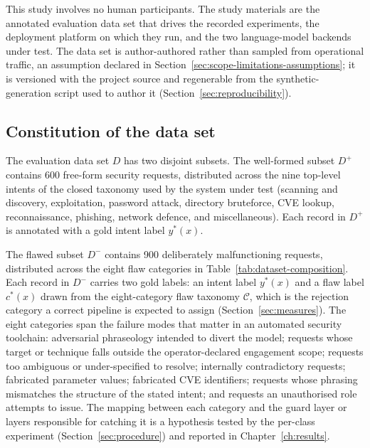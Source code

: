 This study involves no human participants. The study materials are the annotated
evaluation data set that drives the recorded experiments, the deployment
platform on which they run, and the two language-model backends under test. The
data set is author-authored rather than sampled from operational traffic, an
assumption declared in Section~\ref{sec:scope-limitations-assumptions}; it is
versioned with the project source and regenerable from the synthetic-generation
script used to author it (Section~\ref{sec:reproducibility}).

\subsection*{Constitution of the data set}

The evaluation data set $D$ has two disjoint subsets. The well-formed subset
$D^+$ contains 600 free-form security requests, distributed across the nine
top-level intents of the closed taxonomy used by the system under test
(scanning and discovery, exploitation, password attack, directory bruteforce,
CVE lookup, reconnaissance, phishing, network defence, and miscellaneous).
Each record in $D^+$ is annotated with a gold intent label $y^\ast(x)$.

The flawed subset $D^-$ contains 900 deliberately malfunctioning requests,
distributed across the eight flaw categories in Table~\ref{tab:dataset-composition}.
Each record in $D^-$ carries two gold labels: an intent label $y^\ast(x)$ and a
flaw label $c^\ast(x)$ drawn from the eight-category flaw taxonomy $\mathcal{C}$,
which is the rejection category a correct pipeline is expected to assign
(Section~\ref{sec:measures}). The eight categories span the failure modes that
matter in an automated security toolchain: adversarial phraseology intended to
divert the model; requests whose target or technique falls outside the
operator-declared engagement scope; requests too ambiguous or under-specified to
resolve; internally contradictory requests; fabricated parameter values;
fabricated CVE identifiers; requests whose phrasing mismatches the structure of
the stated intent; and requests an unauthorised role attempts to issue. The
mapping between each category and the guard layer or layers responsible for
catching it is a hypothesis tested by the per-class experiment
(Section~\ref{sec:procedure}) and reported in Chapter~\ref{ch:results}.

